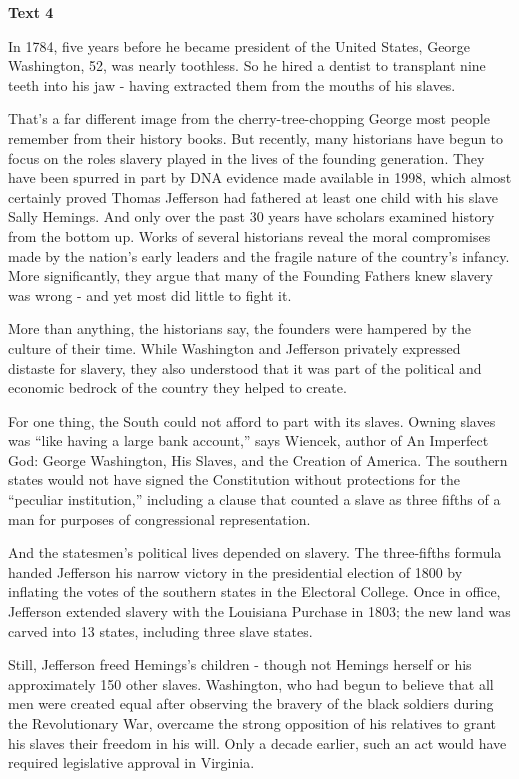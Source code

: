 \begin{center}\textbf{Text 4}\end{center}

\qquad In 1784, five years before he became president of the United States, George Washington, 52, was nearly toothless. So he hired a dentist to transplant nine teeth into his jaw - having extracted them from the mouths of his slaves.

\qquad That’s a far different image from the cherry-tree-chopping George most people remember from their history books. But recently, many historians have begun to focus on the roles slavery played in the lives of the founding generation. They have been spurred in part by DNA evidence made available in 1998, which almost certainly proved Thomas Jefferson had fathered at least one child with his slave Sally Hemings. And only over the past 30 years have scholars examined history from the bottom up. Works of several historians reveal the moral compromises made by the nation’s early leaders and the fragile nature of the country’s infancy. More significantly, they argue that many of the Founding Fathers knew slavery was wrong - and yet most did little to fight it.

\qquad More than anything, the historians say, the founders were hampered by the culture of their time. While Washington and Jefferson privately expressed distaste for slavery, they also understood that it was part of the political and economic bedrock of the country they helped to create.

\qquad For one thing, the South could not afford to part with its slaves. Owning slaves was “like having a large bank account,” says Wiencek, author of An Imperfect God: George Washington, His Slaves, and the Creation of America. The southern states would not have signed the Constitution without protections for the “peculiar institution,” including a clause that counted a slave as three fifths of a man for purposes of congressional representation.

\qquad And the statesmen’s political lives depended on slavery. The three-fifths formula handed Jefferson his narrow victory in the presidential election of 1800 by inflating the votes of the southern states in the Electoral College. Once in office, Jefferson extended slavery with the Louisiana Purchase in 1803; the new land was carved into 13 states, including three slave states.

\qquad Still, Jefferson freed Hemings’s children - though not Hemings herself or his approximately 150 other slaves. Washington, who had begun to believe that all men were created equal after observing the bravery of the black soldiers during the Revolutionary War, overcame the strong opposition of his relatives to grant his slaves their freedom in his will. Only a decade earlier, such an act would have required legislative approval in Virginia.

